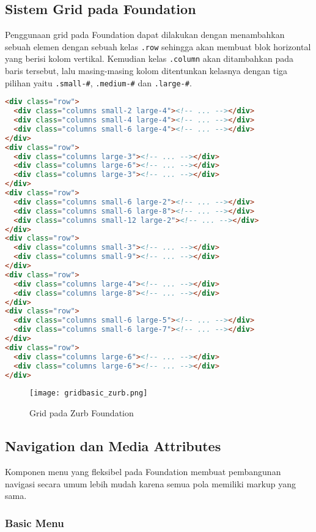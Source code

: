 \begin{itemize}
\subsection{Sistem Grid pada Foundation}
Penggunaan grid pada Foundation dapat dilakukan dengan menambahkan sebuah elemen dengan sebuah kelas \texttt{.row} sehingga akan membuat blok horizontal yang berisi kolom vertikal. Kemudian kelas \texttt{.column} akan ditambahkan pada baris tersebut, lalu masing-masing kolom ditentunkan kelasnya dengan tiga pilihan yaitu 
\texttt{.small-\#}, \texttt{.medium-\#} dan \texttt{.large-\#}.
 
\begin{lstlisting}[language=HTML, frame=single, basicstyle=\small] 
<div class="row">
  <div class="columns small-2 large-4"><!-- ... --></div>
  <div class="columns small-4 large-4"><!-- ... --></div>
  <div class="columns small-6 large-4"><!-- ... --></div>
</div>
<div class="row">
  <div class="columns large-3"><!-- ... --></div>
  <div class="columns large-6"><!-- ... --></div>
  <div class="columns large-3"><!-- ... --></div>
</div>
<div class="row">
  <div class="columns small-6 large-2"><!-- ... --></div>
  <div class="columns small-6 large-8"><!-- ... --></div>
  <div class="columns small-12 large-2"><!-- ... --></div>
</div>
<div class="row">
  <div class="columns small-3"><!-- ... --></div>
  <div class="columns small-9"><!-- ... --></div>
</div>
<div class="row">
  <div class="columns large-4"><!-- ... --></div>
  <div class="columns large-8"><!-- ... --></div>
</div>
<div class="row">
  <div class="columns small-6 large-5"><!-- ... --></div>
  <div class="columns small-6 large-7"><!-- ... --></div>
</div>
<div class="row">
  <div class="columns large-6"><!-- ... --></div>
  <div class="columns large-6"><!-- ... --></div>
</div>
\end{lstlisting}

\begin{figure} [H]
	\centering  
	\texttt{[image: gridbasic\_zurb.png]}  
	\caption{Grid pada Zurb Foundation}	 
\end{figure}

\subsection{Navigation dan Media Attributes}
Komponen menu yang fleksibel pada Foundation membuat pembangunan navigasi secara umum lebih mudah karena semua pola memiliki markup yang sama.

\subsubsection{Basic Menu}


\end{itemize}
